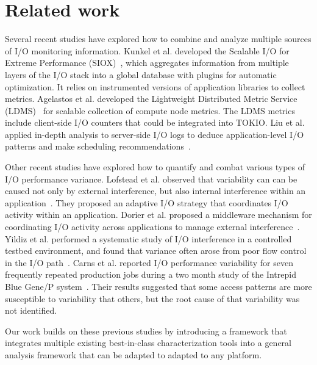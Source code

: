 \section{Related work} \label{sec:related}

Several recent studies have explored how to combine
and analyze multiple sources of I/O monitoring information.
Kunkel et al. developed the Scalable I/O for Extreme Performance
(SIOX)~\cite{Kunkel:2014:SAC:2769884.2769901}, which aggregates
information from multiple layers of the I/O stack into a global database
with plugins for automatic optimization.  It relies on instrumented
versions of application libraries to collect metrics.  Agelastos et al.
developed the Lightweight Distributed Metric Service (LDMS)~\cite{7013000}
for scalable collection of compute node metrics. The LDMS metrics include
client-side I/O counters that could be integrated into TOKIO.  Liu et al. applied in-depth
analysis to server-side I/O logs to deduce application-level I/O patterns
and make scheduling recommendations~\cite{Liu2016}.

Other recent studies have explored how to quantify and combat various
types of I/O performance variance.  Lofstead et al. observed that
variability can can be caused not only by external interference, but also
internal interference within an application~\cite{lofstead2010managing}.
They proposed an adaptive I/O strategy that coordinates I/O activity
within an application.  Dorier et al. proposed a middleware mechanism
for coordinating I/O activity across applications to manage external
interference~\cite{dorier2014calciom}.  Yildiz et al. performed a
systematic study of I/O interference in a controlled testbed environment,
and found that variance often arose from poor flow control in the I/O
path~\cite{Yildiz2016}.  Carns et al. reported I/O performance variability
for seven frequently repeated production jobs during a two month study
of the Intrepid Blue Gene/P system~\cite{carns2011understanding}.
Their results suggested that some access patterns are more susceptible
to variability that others, but the root cause of that variability was
not identified.

Our work builds on these previous studies by introducing a framework that
integrates multiple existing best-in-class characterization tools into a
general analysis framework that can be adapted to adapted to any platform.


